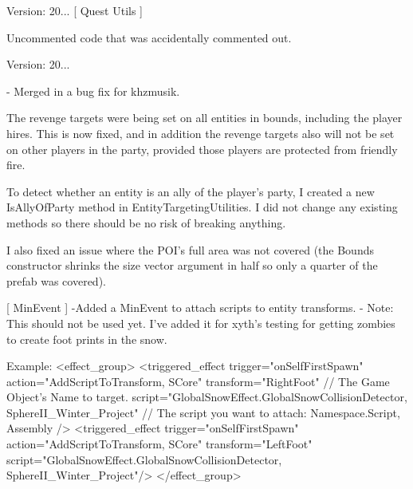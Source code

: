 Version\+: 20... \mbox{[} Quest Utils \mbox{]}
\begin{DoxyItemize}
\item Uncommented code that was accidentally commented out.
\end{DoxyItemize}

Version\+: 20... \begin{DoxyVerb}
    - Merged in a bug fix for khzmusik.

    The revenge targets were being set on all entities in bounds, including the player hires. 
    This is now fixed, and in addition the revenge targets also will not be set on other players in the party, 
        provided those players are protected from friendly fire.

    To detect whether an entity is an ally of the player's party, I created a new IsAllyOfParty method in EntityTargetingUtilities. 
    I did not change any existing methods so there should be no risk of breaking anything.

    I also fixed an issue where the POI's full area was not covered (the Bounds constructor shrinks the size vector 
        argument in half so only a quarter of the prefab was covered).

[ MinEvent ] 
    -Added a MinEvent to attach scripts to entity transforms.
    - Note: This should not be used yet. I've added it for xyth's testing for getting zombies to create foot prints in the snow.

    Example:
        <effect_group>
            <triggered_effect trigger="onSelfFirstSpawn" 
                action="AddScriptToTransform, SCore" 
                transform="RightFoot"    // The Game Object's Name to target.
                script="GlobalSnowEffect.GlobalSnowCollisionDetector, SphereII_Winter_Project"  // The script you want to attach:  Namespace.Script, Assembly
            />
            <triggered_effect trigger="onSelfFirstSpawn" action="AddScriptToTransform, SCore" transform="LeftFoot" script="GlobalSnowEffect.GlobalSnowCollisionDetector, SphereII_Winter_Project"/>
        </effect_group>
\end{DoxyVerb}
